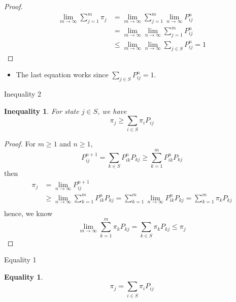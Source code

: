 \documentclass[mathserif]{beamer}
\newtheorem{ineq}{Inequality}
\newtheorem{eq}{Equality}
\begin{document}
\begin{frame}
	\begin{proof}
		\begin{align*}
			\lim_{m \to \infty} \sum_{j=1}^m \pi_j &= \lim_{m \to \infty} \sum_{j=1}^m \lim_{n \to \infty} P^n_{ij} \\
			&= \lim_{m \to \infty} \lim_{n \to \infty} \sum_{j=1}^m P^n_{ij} \\
			&\leq \lim_{m \to \infty} \lim_{n \to \infty} \sum_{j \in S} P^n_{ij} = 1
		\end{align*}
	\end{proof}
	\begin{itemize}
		\item The last equation works since $\sum_{j \in S} P^n_{ij} = 1$.
	\end{itemize}
\end{frame}

\begin{frame}{Inequality 2}
	\begin{ineq}
		For state $j \in S$, we have
		\[
		\pi_j \geq \sum_{i \in S} \pi_i P_{ij}
		\]
	\end{ineq}
\end{frame}

\begin{frame}[shrink]
	\begin{proof}
		For $m \geq 1$ and $n \geq 1$,
		\[
		P^{n+1}_{ij} = \sum_{k \in S} P^n_{ik} P_{kj} \geq \sum_{k=1}^m P^n_{ik} P_{kj}
		\]
		then
		\begin{align*}
			\pi_j &= \lim_{n \to \infty} P^{n+1}_{ij} \\
			&\geq \lim_{n \to \infty} \sum_{k=1}^m P^n_{ik} P_{kj} 
			 = \sum_{k=1}^m \lim_{n \to \infty} P^n_{ik} P_{kj} 
			 = \sum_{k=1}^m \pi_k P_{kj}\\
		\end{align*}
		hence, we know
		\[
		\lim_{m\to\infty} \sum_{k=1}^m \pi_k P_{kj} = \sum_{k \in S} \pi_k P_{kj} \leq \pi_j
		\]
	\end{proof}
\end{frame}

\begin{frame}{Equality 1}
	\begin{eq}
		\[
		\pi_j = \sum_{i \in S} \pi_i P_{ij}
		\]
	\end{eq}
\end{frame}
\end{document}
